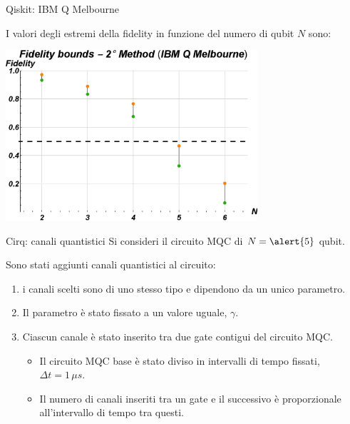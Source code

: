 \documentclass{beamer}
\renewcommand{\'}[0]{\`}
\begin{document}
		
	\begin{frame}{Qiskit: IBM Q Melbourne}

	I valori degli estremi della \alert{fidelity} in funzione del numero di qubit \alert{$N$} sono:
	\vspace{0.5cm}
	
	\centering \includegraphics[width=0.7\textwidth]{./image/F2Metodo_ibmqmelbourne.eps} 		
		
	\end{frame}
	
	\begin{frame}{Cirq: canali quantistici}
	Si consideri il circuito MQC di $N=\alert{5}$ qubit.  \pause
	\vspace{0.3cm}
	
	Sono stati aggiunti \alert{canali quantistici} al circuito: \pause
	
	\begin{enumerate}
	\item i canali scelti sono di uno stesso tipo e dipendono da un unico parametro. \pause
	\item Il parametro è stato fissato a un valore uguale, \alert{$\gamma$}. \pause
	\item Ciascun canale è stato inserito tra due gate contigui del circuito MQC.
		\begin{itemize} 
		\item  Il circuito MQC base è stato diviso in intervalli di tempo fissati, \alert{$\Delta t = 1 \, \mu s$}. 
		\item  Il numero di canali inseriti tra un gate e il successivo è \alert{proporzionale} all'intervallo di tempo tra questi.
		\end{itemize}
	\end{enumerate}
	
	\end{frame}
	
\end{document}
